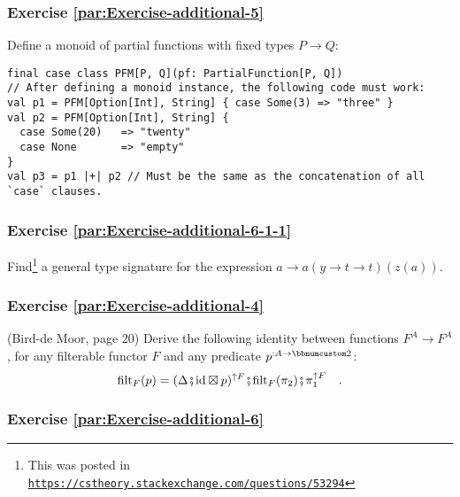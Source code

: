 \subsubsection{Exercise \label{par:Exercise-additional-5}\ref{par:Exercise-additional-5}}

Define a monoid of partial functions with fixed types $P\rightarrow Q$:
\begin{lstlisting}
final case class PFM[P, Q](pf: PartialFunction[P, Q])
// After defining a monoid instance, the following code must work:
val p1 = PFM[Option[Int], String] { case Some(3) => "three" }
val p2 = PFM[Option[Int], String] {
  case Some(20)   => "twenty"
  case None       => "empty"
}
val p3 = p1 |+| p2 // Must be the same as the concatenation of all `case` clauses.
\end{lstlisting}


\subsubsection{Exercise \label{par:Exercise-additional-6-1-1}\ref{par:Exercise-additional-6-1-1}}

Find\footnote{This was posted in \texttt{\href{https://cstheory.stackexchange.com/questions/53294}{https://cstheory.stackexchange.com/questions/53294}}}
a general type signature for the expression $a\rightarrow a(y\rightarrow t\rightarrow t)(z(a))$. 

\subsubsection{Exercise \label{par:Exercise-additional-4}\ref{par:Exercise-additional-4}}

(Bird-de Moor, page 20) Derive the following identity between functions
$F^{A}\rightarrow F^{A}$, for any filterable functor $F$ and any
predicate $p^{:A\rightarrow\bbnum 2}$: 
\[
\text{filt}_{F}(p)=(\Delta\bef\text{id}\boxtimes p)^{\uparrow F}\bef\text{filt}_{F}(\pi_{2})\bef\pi_{1}^{\uparrow F}\quad.
\]


\subsubsection{Exercise \label{par:Exercise-additional-6}\ref{par:Exercise-additional-6}}

